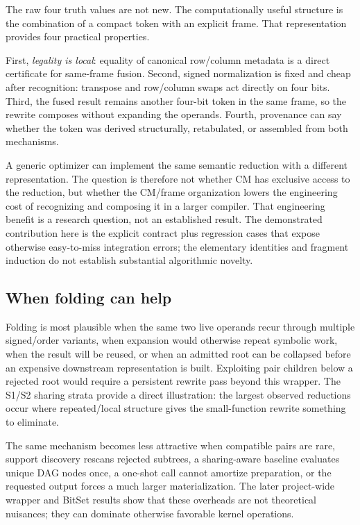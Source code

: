 \documentclass[10pt]{article}
\theoremstyle{plain}
\theoremstyle{definition}
\theoremstyle{remark}
\begin{document}
The raw four truth values are not new. The computationally useful structure is the combination of a compact token with an explicit frame. That representation provides four practical properties.

First, \emph{legality is local}: equality of canonical row/column metadata is a direct certificate for same-frame fusion. Second, signed normalization is fixed and cheap after recognition: transpose and row/column swaps act directly on four bits. Third, the fused result remains another four-bit token in the same frame, so the rewrite composes without expanding the operands. Fourth, provenance can say whether the token was derived structurally, retabulated, or assembled from both mechanisms.

A generic optimizer can implement the same semantic reduction with a different representation. The question is therefore not whether CM has exclusive access to the reduction, but whether the CM/frame organization lowers the engineering cost of recognizing and composing it in a larger compiler. That engineering benefit is a research question, not an established result. The demonstrated contribution here is the explicit contract plus regression cases that expose otherwise easy-to-miss integration errors; the elementary identities and fragment induction do not establish substantial algorithmic novelty.

\subsection{When folding can help}

Folding is most plausible when the same two live operands recur through multiple signed/order variants, when expansion would otherwise repeat symbolic work, when the result will be reused, or when an admitted root can be collapsed before an expensive downstream representation is built. Exploiting pair children below a rejected root would require a persistent rewrite pass beyond this wrapper. The S1/S2 sharing strata provide a direct illustration: the largest observed reductions occur where repeated/local structure gives the small-function rewrite something to eliminate.

The same mechanism becomes less attractive when compatible pairs are rare, support discovery rescans rejected subtrees, a sharing-aware baseline evaluates unique DAG nodes once, a one-shot call cannot amortize preparation, or the requested output forces a much larger materialization. The later project-wide wrapper and BitSet results show that these overheads are not theoretical nuisances; they can dominate otherwise favorable kernel operations.
\end{document}

